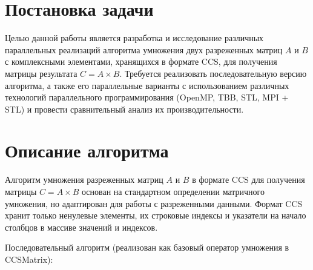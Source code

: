 \documentclass[12pt]{article}
\begin{document}
\section{Постановка задачи}
Целью данной работы является разработка и исследование различных параллельных реализаций алгоритма умножения двух разреженных матриц $A$ и $B$ с комплексными элементами, хранящихся в формате CCS, для получения матрицы результата $C = A \times B$. Требуется реализовать последовательную версию алгоритма, а также его параллельные варианты с использованием различных технологий параллельного программирования (OpenMP, TBB, STL, MPI + STL) и провести сравнительный анализ их производительности.
\newpage

\section{Описание алгоритма}
Алгоритм умножения разреженных матриц $A$ и $B$ в формате CCS для получения матрицы $C = A \times B$ основан на стандартном определении матричного умножения, но адаптирован для работы с разреженными данными. Формат CCS хранит только ненулевые элементы, их строковые индексы и указатели на начало столбцов в массиве значений и индексов.

Последовательный алгоритм (реализован как базовый оператор умножения в CCSMatrix):
\end{document}
